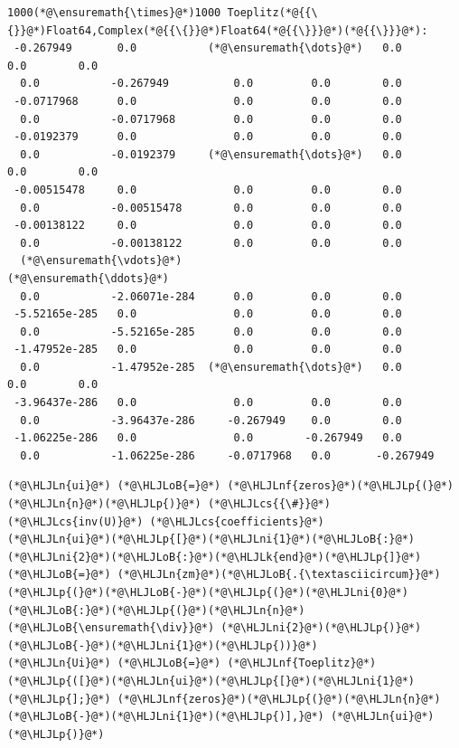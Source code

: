 \documentclass[12pt,a4paper]{article}
\newcommand{\HLJLk}[1]{\textcolor[RGB]{148,91,176}{\textbf{#1}}}
\newcommand{\HLJLn}[1]{#1}
\newcommand{\HLJLnf}[1]{\textcolor[RGB]{66,102,213}{#1}}
\newcommand{\HLJLni}[1]{\textcolor[RGB]{59,151,46}{#1}}
\newcommand{\HLJLoB}[1]{\textcolor[RGB]{102,102,102}{\textbf{#1}}}
\newcommand{\HLJLp}[1]{#1}
\newcommand{\HLJLcs}[1]{\textcolor[RGB]{153,153,119}{\textit{#1}}}
\begin{document}
\begin{lstlisting}
1000(*@\ensuremath{\times}@*)1000 Toeplitz(*@{{\{}}@*)Float64,Complex(*@{{\{}}@*)Float64(*@{{\}}}@*)(*@{{\}}}@*):
 -0.267949       0.0           (*@\ensuremath{\dots}@*)   0.0         0.0        0.0
  0.0           -0.267949          0.0         0.0        0.0
 -0.0717968      0.0               0.0         0.0        0.0
  0.0           -0.0717968         0.0         0.0        0.0
 -0.0192379      0.0               0.0         0.0        0.0
  0.0           -0.0192379     (*@\ensuremath{\dots}@*)   0.0         0.0        0.0
 -0.00515478     0.0               0.0         0.0        0.0
  0.0           -0.00515478        0.0         0.0        0.0
 -0.00138122     0.0               0.0         0.0        0.0
  0.0           -0.00138122        0.0         0.0        0.0
  (*@\ensuremath{\vdots}@*)                            (*@\ensuremath{\ddots}@*)                         
  0.0           -2.06071e-284      0.0         0.0        0.0
 -5.52165e-285   0.0               0.0         0.0        0.0
  0.0           -5.52165e-285      0.0         0.0        0.0
 -1.47952e-285   0.0               0.0         0.0        0.0
  0.0           -1.47952e-285  (*@\ensuremath{\dots}@*)   0.0         0.0        0.0
 -3.96437e-286   0.0               0.0         0.0        0.0
  0.0           -3.96437e-286     -0.267949    0.0        0.0
 -1.06225e-286   0.0               0.0        -0.267949   0.0
  0.0           -1.06225e-286     -0.0717968   0.0       -0.267949
\end{lstlisting}


\begin{lstlisting}
(*@\HLJLn{ui}@*) (*@\HLJLoB{=}@*) (*@\HLJLnf{zeros}@*)(*@\HLJLp{(}@*)(*@\HLJLn{n}@*)(*@\HLJLp{)}@*) (*@\HLJLcs{{\#}}@*) (*@\HLJLcs{inv(U)}@*) (*@\HLJLcs{coefficients}@*)
(*@\HLJLn{ui}@*)(*@\HLJLp{[}@*)(*@\HLJLni{1}@*)(*@\HLJLoB{:}@*)(*@\HLJLni{2}@*)(*@\HLJLoB{:}@*)(*@\HLJLk{end}@*)(*@\HLJLp{]}@*) (*@\HLJLoB{=}@*) (*@\HLJLn{zm}@*)(*@\HLJLoB{.{\textasciicircum}}@*)(*@\HLJLp{(}@*)(*@\HLJLoB{-}@*)(*@\HLJLp{(}@*)(*@\HLJLni{0}@*)(*@\HLJLoB{:}@*)(*@\HLJLp{(}@*)(*@\HLJLn{n}@*) (*@\HLJLoB{\ensuremath{\div}}@*) (*@\HLJLni{2}@*)(*@\HLJLp{)}@*)(*@\HLJLoB{-}@*)(*@\HLJLni{1}@*)(*@\HLJLp{))}@*)
(*@\HLJLn{Ui}@*) (*@\HLJLoB{=}@*) (*@\HLJLnf{Toeplitz}@*)(*@\HLJLp{([}@*)(*@\HLJLn{ui}@*)(*@\HLJLp{[}@*)(*@\HLJLni{1}@*)(*@\HLJLp{];}@*) (*@\HLJLnf{zeros}@*)(*@\HLJLp{(}@*)(*@\HLJLn{n}@*)(*@\HLJLoB{-}@*)(*@\HLJLni{1}@*)(*@\HLJLp{)],}@*) (*@\HLJLn{ui}@*)(*@\HLJLp{)}@*)
\end{lstlisting}
\end{document}
